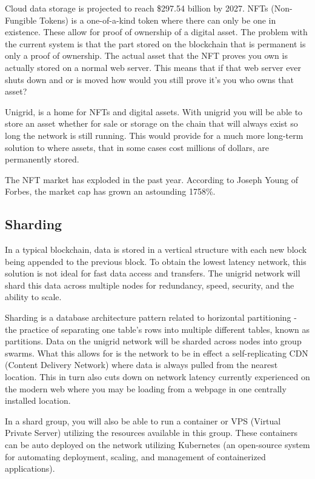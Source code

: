 \documentclass[12pt]{article}
\begin{document}
Cloud data storage is projected to reach \$297.54 billion by 2027\cite{fort2021}. NFTs (Non-Fungible Tokens) is a one-of-a-kind token where there can only be one in existence. These allow for proof of ownership of a digital asset. The problem with the current system is that the part stored on the blockchain that is permanent is only a proof of ownership. The actual asset that the NFT proves you own is actually stored on a normal web server. This means that if that web server ever shuts down and or is moved how would you still prove it's you who owns that asset?

Unigrid, is a home for NFTs and digital assets. With unigrid you will be able to store an asset whether for sale or storage on the chain that will always exist so long the network is still running. This would provide for a much more long-term solution to where assets, that in some cases cost millions of dollars, are permanently stored.

The NFT market has exploded in the past year. According to Joseph Young of Forbes, the market cap has grown an astounding 1758\%\cite{young2021}.


\subsection*{Sharding}
In a typical blockchain, data is stored in a vertical structure with each new block being appended to the previous block. To obtain the lowest latency network, this solution is not ideal for fast data access and transfers. The unigrid network will shard this data across multiple nodes for redundancy, speed, security, and the ability to scale.

Sharding is a database architecture pattern related to horizontal partitioning - the practice of separating one table’s rows into multiple different tables, known as partitions\cite{mark2019}. Data on the unigrid network will be sharded across nodes into group swarms. What this allows for is the network to be in effect a self-replicating CDN (Content Delivery Network) where data is always pulled from the nearest location. This in turn also cuts down on network latency currently experienced on the modern web where you may be loading from a webpage in one centrally installed location.

In a shard group, you will also be able to run a container or VPS (Virtual Private Server) utilizing the resources available in this group. These containers can be auto deployed on the network utilizing Kubernetes (an open-source system for automating deployment, scaling, and management of containerized applications).
\end{document}
